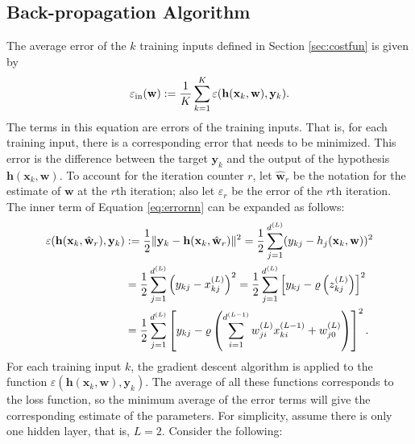 \subsection{Back-propagation Algorithm}\label{sec:backprop}
The average error of the $k$ training inputs defined in Section \ref{sec:costfun} is given by
\begin{equation}\label{eq:errornn}
\varepsilon_{\mathrm{in}}(\mathbf{w}):=\frac{1}{K}\sum_{k=1}^{K}\varepsilon(\mathbf{h}(\mathbf{x}_k,\mathbf{w}),\mathbf{y}_k).
\end{equation}
The terms in this equation are errors of the training inputs. That is, for each training input, there is a corresponding error that needs to be minimized. This error is the difference between the target $\mathbf{y}_k$ and the output of the hypothesis $\mathbf{h}(\mathbf{x}_k,\mathbf{w})$. To account for the iteration counter $r$, let $\hat{\mathbf{w}}_r$ be the notation for the estimate of $\mathbf{w}$ at the $r$th iteration; also let $\varepsilon_r$ be the error of the $r$th iteration. The inner term of Equation \ref{eq:errornn} can be expanded as follows:
\begin{align}
\varepsilon(\mathbf{h}(\mathbf{x}_k,\hat{\mathbf{w}}_r),\mathbf{y}_k)&:=\frac{1}{2}\lVert\mathbf{y}_k-\mathbf{h}(\mathbf{x}_k,\hat{\mathbf{w}}_r)\rVert^2=\frac{1}{2}\sum_{j=1}^{d^{(L)}}(y_{kj}-h_j(\mathbf{x}_k,\mathbf{w}))^2\nonumber\\
&=\frac{1}{2}\sum_{j=1}^{d^{(L)}}\left(y_{kj}-x_{kj}^{(L)}\right)^2=\frac{1}{2}\sum_{j=1}^{d^{(L)}}\left[y_{kj}-\varrho\left(z_{kj}^{(L)}\right)\right]^2\nonumber\\
&=\frac{1}{2}\sum_{j=1}^{d^{(L)}}\left[y_{kj}-\varrho\left(\sum_{i=1}^{d^{(L-1)}}w_{ji}^{(L)}x_{ki}^{(L-1)}+w_{j0}^{(L)}\right)\right]^2.
\end{align}
For each training input $k$, the gradient descent algorithm is applied to the function $\varepsilon(\mathbf{h}(\mathbf{x}_k,\mathbf{w}),\mathbf{y}_{k})$. The average of all these functions corresponds to the loss function, so the minimum average of the error terms will give the corresponding estimate of the parameters. For simplicity, assume there is only one hidden layer, that is, $L=2$. Consider the following:

